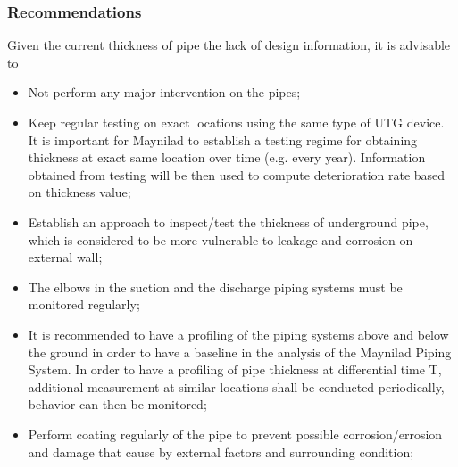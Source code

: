 









\subsubsection{Recommendations}
Given the current thickness of pipe the lack of design information, it is advisable to 
\begin{itemize}
\item Not perform any major intervention on the pipes;
\item Keep regular testing on exact locations using the same type of UTG device. It is important for Maynilad to establish a testing regime for obtaining thickness at exact same location over time (e.g. every year). Information obtained from testing will be then used to compute deterioration rate based on thickness value;
\item Establish an approach to inspect/test the thickness of underground pipe, which is considered to be more vulnerable to leakage and corrosion on external wall;
\item The elbows in the suction and the discharge piping systems must be monitored regularly;
\item It is recommended to have a profiling of the piping systems above and below the ground in order to have a baseline in the analysis of the Maynilad Piping System. In order to have a profiling of pipe thickness at differential time T, additional measurement at similar locations shall be conducted periodically, behavior can then be monitored;
\item Perform coating regularly of the pipe to prevent possible corrosion/errosion and damage that cause by external factors and surrounding condition;
\end{itemize}
%